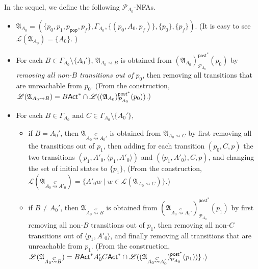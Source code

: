\documentclass[preprint,12pt]{elsarticle}
\newcommand\Pp{{\mathcal{P} }}
\newcommand\act{{\sf Act}}
\newcommand\post{{\mathsf{post} }}
\newcommand\Aut{{\mathfrak{A} }}
\newcommand\Lang{{\mathscr{L} }}
\newcommand{\NFA}{\textsf{NFA}}
\newcommand\pop{\mathsf{pop}}
\begin{document}
In the sequel, we define the following $\Pp_{A_0}$-{\NFA}s.   
\begin{itemize}
    \item $\Aut_{A_0} = (\{p_0, p_1, p_\pop, p_f\}, \Gamma_{A_0}, \{(p_0,A_0,p_f)\}, \{p_0\}, \{p_f\})$. (It is easy to see $\Lang(\Aut_{A_0}) = \{A_0\}$. )
    \item For each $B \in \Gamma_{A_0} \setminus \{A_0'\}$, $\Aut_{A_0\rightsquigarrow B}$ is obtained from $(\Aut_{A_0})^{\post^*}_{\Pp_{A_0}}(p_0)$ by \emph{removing all non-$B$ transitions out of $p_0$}, then removing all transitions that are unreachable from $p_0$. (From the construction, $\Lang(\Aut_{A_0\rightsquigarrow B}) = B\act^* \cap \Lang((\Aut_{A_0})^{\post^*}_{\Pp_{A_0}}(p_0))$.)
    \item For each $B\in\Gamma_{A_0}$ and $C\in\Gamma_{A_0}\setminus\{A_0'\}$, 
    \begin{itemize}
        \item if $B = A_0'$, then $\Aut_{A_0\stackrel{C}\rightsquigarrow A_0'}$ is obtained from $\Aut_{A_0 \rightsquigarrow C}$ by first removing all the transitions out of $p_1$, then adding for each transition $(p_0, C, p)$ the two transitions $(p_1, A'_0, \langle p_1, A'_0 \rangle)$ and $(\langle p_1, A'_0 \rangle, C, p)$, and changing the set of initial states to $\{p_1\}$,  (From the construction, $\Lang(\Aut_{A_0\stackrel{C}\rightsquigarrow A'_0})  = \{A'_0 w \mid w \in  \Lang(\Aut_{A_0 \rightsquigarrow C}) \}$.)
        
%
        \item if $B \neq A_0'$, then $\Aut_{A_0\stackrel{C}\rightsquigarrow B}$ is obtained from $(\Aut_{A_0\stackrel{C}\rightsquigarrow A_0'})^{\post^*}_{\Pp_{A_0}}(p_1)$ by first removing all  non-$B$ transitions out of $p_1$, then removing all non-$C$ transitions out of $\langle p_1, A'_0\rangle$, and finally removing all transitions that are unreachable from $p_1$. (From the construction, $\Lang(\Aut_{A_0\stackrel{C}\rightsquigarrow B})  = B\act^*A_0'C\act^*\cap\Lang((\Aut_{A_0 \stackrel{C}\rightsquigarrow A_0'})^{\post^*}_{\Pp_{A_0}}(p_1)) \}$.)
    \end{itemize}
\end{itemize}
\end{document}
